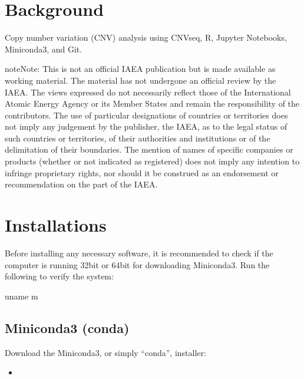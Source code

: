 \documentclass[letterpaper,10pt,english]{sphinxhowto}
\begin{document}
\pagestyle{plain}
\sphinxtableofcontents
\pagestyle{normal}
\label{\detokenize{index::doc}}



\section{Background}
\label{\detokenize{index:background}}
\sphinxAtStartPar
\sphinxstylestrong{{[}DRAFT{]}}

\sphinxAtStartPar
Copy number variation (CNV) analysis using CNV\sphinxhyphen{}seq, R, Jupyter Notebooks, Miniconda3, and Git.

\begin{sphinxadmonition}{note}{Note:}
\sphinxAtStartPar
This is not an official IAEA publication but is made available as working material. The material has not undergone an official review by the IAEA. The views expressed do not necessarily reflect those of the International Atomic Energy Agency or its Member States and remain the responsibility of the contributors. The use of particular designations of countries or territories does not imply any judgement by the publisher, the IAEA, as to the legal status of such countries or territories, of their authorities and institutions or of the delimitation of their boundaries. The mention of names of specific companies or products (whether or not indicated as registered) does not imply any intention to infringe proprietary rights, nor should it be construed as an endorsement or recommendation on the part of the IAEA.
\end{sphinxadmonition}


\section{Installations}
\label{\detokenize{index:installations}}
\sphinxAtStartPar
Before installing any necessary software, it is recommended to check if the computer is running 32\sphinxhyphen{}bit or 64\sphinxhyphen{}bit for downloading Miniconda3. Run the following to verify the system:

\begin{sphinxVerbatim}[commandchars=\\\{\}]
\PYGZdl{} uname \PYGZhy{}m
\end{sphinxVerbatim}


\subsection{Miniconda3 (conda)}
\label{\detokenize{index:miniconda3-conda}}
\sphinxAtStartPar
Download the Miniconda3, or simply “conda”, installer:
\begin{itemize}
\item {} 
\sphinxAtStartPar
{}

\end{itemize}
\end{document}

